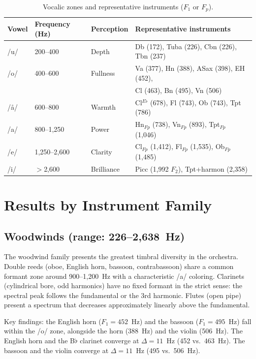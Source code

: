 \documentclass[12pt,a4paper]{article}
\begin{document}
\begin{table}[htbp]
\centering
\caption{Vocalic zones and representative instruments ($F_1$ or $F_p$).}
\label{tab:vowels}
\begin{tabular}{llll}
\toprule
Vowel & Frequency (Hz) & Perception & Representative instruments \\
\midrule
/u/ & 200--400 & Depth     & Db (172), Tuba (226), Cbn (226), Tbn (237) \\
/o/ & 400--600 & Fullness  & Va (377), Hn (388), ASax (398), EH (452), \\
    &          &           & Cl (463), Bn (495), Vn (506) \\
/\aa/ & 600--800 & Warmth  & Cl$^{E\flat}$ (678), Fl (743), Ob (743), Tpt (786) \\
/a/ & 800--1,250 & Power   & Hn$_{Fp}$ (738), Vn$_{Fp}$ (893), Tpt$_{Fp}$ (1,046) \\
/e/ & 1,250--2,600 & Clarity & Cl$_{Fp}$ (1,412), Fl$_{Fp}$ (1,535), Ob$_{Fp}$ (1,485) \\
/i/ & $>$2,600 & Brilliance & Picc (1,992 $F_2$), Tpt+harmon (2,358) \\
\bottomrule
\end{tabular}
\end{table}

\section{Results by Instrument Family}

\subsection{Woodwinds (range: 226--2,638~Hz)}

The woodwind family presents the greatest timbral diversity in the orchestra.
Double reeds (oboe, English horn, bassoon, contrabassoon) share a common
formant zone around 900--1,200~Hz with a characteristic /a/ coloring. Clarinets
(cylindrical bore, odd harmonics) have no fixed formant in the strict sense:
the spectral peak follows the fundamental or the 3rd harmonic. Flutes (open
pipe) present a spectrum that decreases approximately linearly above the
fundamental.

Key findings: the English horn ($F_1 = 452$~Hz) and the bassoon
($F_1 = 495$~Hz) fall within the /o/ zone, alongside the horn (388~Hz) and the
violin (506~Hz). The English horn and the B$\flat$ clarinet converge at
$\Delta = 11$~Hz (452 vs.\ 463~Hz). The bassoon and the violin converge at
$\Delta = 11$~Hz (495 vs.\ 506~Hz).
\end{document}

